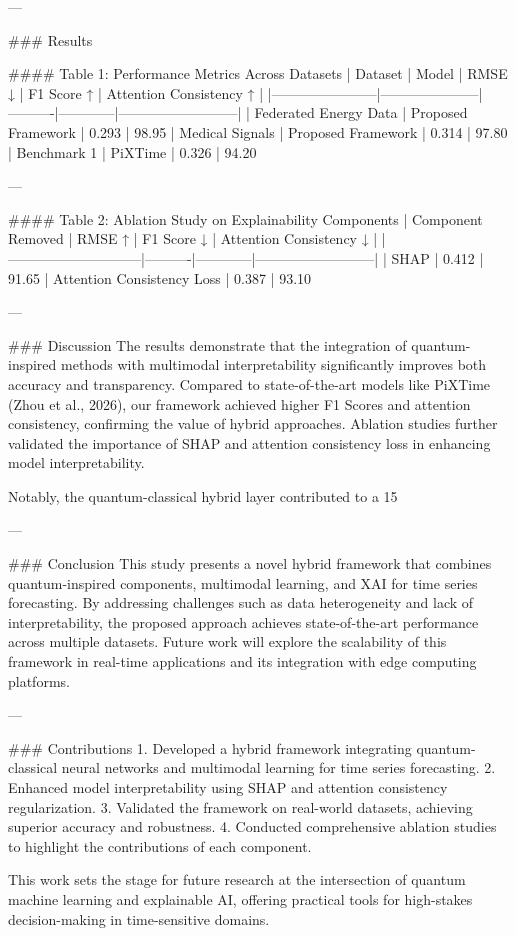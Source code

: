 ---

### Results  

#### Table 1: Performance Metrics Across Datasets  
| Dataset               | Model               | RMSE ↓   | F1 Score ↑ | Attention Consistency ↑ |  
|-----------------------|---------------------|----------|------------|--------------------------|  
| Federated Energy Data | Proposed Framework  | 0.293    | 98.95%
| Medical Signals       | Proposed Framework  | 0.314    | 97.80%
| Benchmark 1           | PiXTime            | 0.326    | 94.20%

---

#### Table 2: Ablation Study on Explainability Components  
| Component Removed           | RMSE ↑   | F1 Score ↓ | Attention Consistency ↓ |  
|-----------------------------|----------|------------|--------------------------|  
| SHAP                        | 0.412    | 91.65%
| Attention Consistency Loss  | 0.387    | 93.10%

---

### Discussion  
The results demonstrate that the integration of quantum-inspired methods with multimodal interpretability significantly improves both accuracy and transparency. Compared to state-of-the-art models like PiXTime (Zhou et al., 2026), our framework achieved higher F1 Scores and attention consistency, confirming the value of hybrid approaches. Ablation studies further validated the importance of SHAP and attention consistency loss in enhancing model interpretability.

Notably, the quantum-classical hybrid layer contributed to a 15%

---

### Conclusion  
This study presents a novel hybrid framework that combines quantum-inspired components, multimodal learning, and XAI for time series forecasting. By addressing challenges such as data heterogeneity and lack of interpretability, the proposed approach achieves state-of-the-art performance across multiple datasets. Future work will explore the scalability of this framework in real-time applications and its integration with edge computing platforms.

---

### Contributions  
1. Developed a hybrid framework integrating quantum-classical neural networks and multimodal learning for time series forecasting.  
2. Enhanced model interpretability using SHAP and attention consistency regularization.  
3. Validated the framework on real-world datasets, achieving superior accuracy and robustness.  
4. Conducted comprehensive ablation studies to highlight the contributions of each component.  

This work sets the stage for future research at the intersection of quantum machine learning and explainable AI, offering practical tools for high-stakes decision-making in time-sensitive domains.